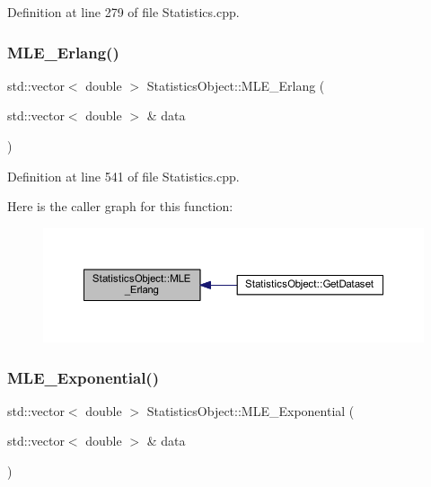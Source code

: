 Definition at line 279 of file Statistics.\+cpp.

\mbox{\label{class_statistics_object_af9e2fe4fdb940206e96af126d60a75c1}} 
\subsubsection{\texorpdfstring{M\+L\+E\+\_\+\+Erlang()}{MLE\_Erlang()}}
{\footnotesize\ttfamily std\+::vector$<$ double $>$ Statistics\+Object\+::\+M\+L\+E\+\_\+\+Erlang (\begin{DoxyParamCaption}\item[{std\+::vector$<$ double $>$ \&}]{data }\end{DoxyParamCaption})\hspace{0.3cm}{\ttfamily [protected]}}



Definition at line 541 of file Statistics.\+cpp.

Here is the caller graph for this function\+:\nopagebreak
\begin{figure}[H]
\begin{center}
\leavevmode
\includegraphics[width=350pt]{class_statistics_object_af9e2fe4fdb940206e96af126d60a75c1_icgraph}
\end{center}
\end{figure}
\mbox{\label{class_statistics_object_a39d960b11bc70f9d402b4f2fb8c31296}} 
\subsubsection{\texorpdfstring{M\+L\+E\+\_\+\+Exponential()}{MLE\_Exponential()}}
{\footnotesize\ttfamily std\+::vector$<$ double $>$ Statistics\+Object\+::\+M\+L\+E\+\_\+\+Exponential (\begin{DoxyParamCaption}\item[{std\+::vector$<$ double $>$ \&}]{data }\end{DoxyParamCaption})\hspace{0.3cm}{\ttfamily [protected]}}



